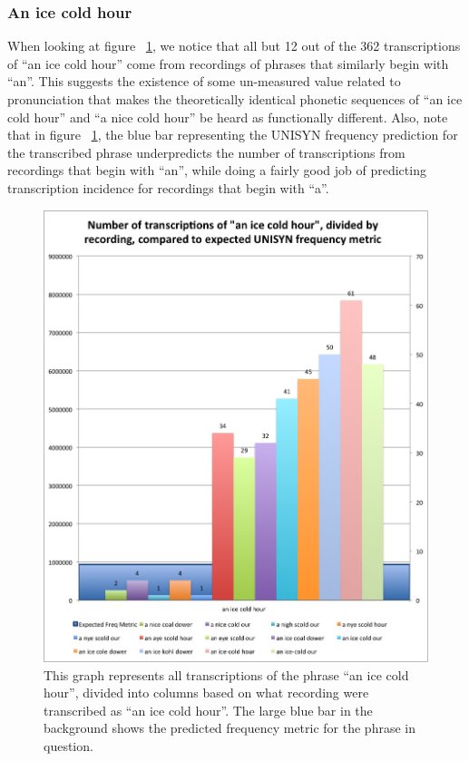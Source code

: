 \subsubsection{An ice cold hour}
\label{results:transcriptionCountPerRecording:an_ice_cold_hour}

When looking at figure ~\ref{fig:results:transcriptionCountPerRecordingAnIceColdHour}, we notice that all but 12 out of the 362 transcriptions of ``an ice cold hour'' come from recordings of phrases that similarly begin with ``an''. This suggests the existence of some un-measured value related to pronunciation that makes the theoretically identical phonetic sequences of ``an ice cold hour'' and ``a nice cold hour'' be heard as functionally different. Also, note that in figure ~\ref{fig:results:transcriptionCountPerRecordingAnIceColdHour}, the blue bar representing the UNISYN frequency prediction for the transcribed phrase underpredicts the number of transcriptions from recordings that begin with ``an'', while doing a fairly good job of predicting transcription incidence for recordings that begin with ``a''.


\begin{figure}
\includegraphics[width=\textwidth]{TranscriptionCountPerRecording_an_IceColdHour.jpg}
\captionfonts
\caption[Transcription Count Per Recording for the transcribed phrase ``an ice cold hour'']{ This graph represents all transcriptions of the phrase ``an ice cold hour'', divided into columns based on what recording were transcribed as ``an ice cold hour''. The large blue bar in the background shows the predicted frequency metric for the phrase in question.}
\label{fig:results:transcriptionCountPerRecordingAnIceColdHour}
\end{figure}

